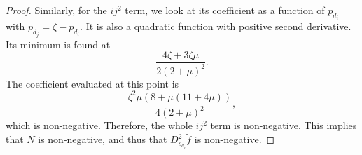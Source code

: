 \documentclass[prodmode,acmtissec]{acmsmall}
\begin{document}
\begin{proof}
Similarly, for the $i j^2$ term, we look at its coefficient as a function of $p_{d_i}$ with $p_{d_j} = \zeta-p_{d_i}$.  It is also a quadratic function with positive second derivative.  Its minimum is found at
\begin{equation*}
\frac{4 \zeta +3 \zeta  \mu }{2 (2+\mu )^2}.
\end{equation*}
The coefficient evaluated at this point is
\begin{equation*}
\frac{\zeta ^2 \mu  (8+\mu  (11+4 \mu ))}{4 (2+\mu )^2},
\end{equation*}
which is non-negative.  Therefore, the whole $i j^2$ term is non-negative.  This implies that $N$ is non-negative, and thus that $D^2_{s_{d_i}} \tilde{f}$ is non-negative.
\end{proof}



\end{document}

